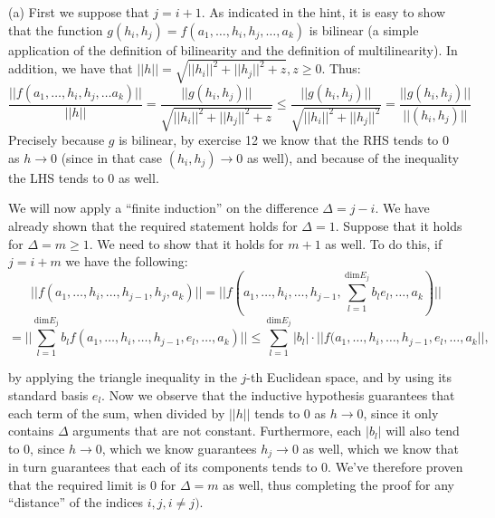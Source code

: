 \begin{solution}

    (a) First we suppose that $j = i +1$.
    As indicated in the hint, it is easy to show that  the function $g(h_i, h_j) = f(a_1, \ldots, h_i, h_{j}, \ldots, a_k)$ is bilinear (a simple application of the definition of bilinearity and the definition of multilinearity).
    In addition, we have that $\lvert \lvert h \rvert \rvert = \sqrt{\lvert \lvert h_i \rvert \rvert^2 + \lvert \lvert h_j \rvert \rvert^2 + z}, z \geq 0$.
    Thus:
    $$\frac{\lvert \lvert f(a_1, \ldots, h_i, h_{j}, \ldots a_k) \rvert \rvert}{\lvert \lvert h \rvert \rvert} = \frac{\lvert \lvert g(h_i, h_j) \rvert \rvert}{\sqrt{\lvert \lvert h_i \rvert \rvert^2 + \lvert \lvert h_j \rvert \rvert^2 + z}} \leq \frac{\lvert \lvert g(h_i, h_j) \rvert \rvert}{\sqrt{\lvert \lvert h_i \rvert \rvert^2 + \lvert \lvert h_j \rvert \rvert^2}} = \frac{\lvert \lvert g(h_i, h_j) \rvert \rvert}{\lvert \lvert (h_i, h_j) \rvert \rvert}$$
    Precisely because $g$ is bilinear, by exercise 12 we know that the RHS tends to 0 as $h \rightarrow 0 $ (since in that case $(h_i, h_j) \rightarrow 0 $ as well), and because of the inequality the LHS tends to 0 as well.

    We will now apply a ``finite induction'' on the difference $\Delta = j - i$.
    We have already shown that the required statement holds for $\Delta = 1$.
    Suppose that it holds for $\Delta = m \geq 1$.
    We need to show that it holds for $m + 1$ as well.
    To do this, if $j = i + m$ we have the following:
    $$\lvert \lvert f(a_1, \ldots, h_i, \ldots, h_{j-1}, h_j, a_k) \rvert \vert = \lvert \lvert f(a_1, \ldots, h_i, \ldots, h_{j-1}, \sum_{l=1}^{\text{dim} E_j} b_l e_l, \ldots, a_k) \rvert \rvert$$
    $$= \lvert \lvert \sum_{l=1}^{\text{dim} E_j} b_l f(a_1, \ldots, h_i, \ldots, h_{j-1}, e_l, \ldots, a_k) \rvert \rvert \leq \sum_{l=1}^{\text{dim} E_j} \lvert b_l \rvert \cdot \lvert \lvert f(a_1, \ldots, h_i, \ldots, h_{j-1}, e_l, \ldots, a_k \rvert \rvert,$$

    by applying the triangle inequality in the $j$-th Euclidean space, and by using its standard basis $e_{l}$. 
    Now we observe that the inductive hypothesis guarantees that each term of the sum, when divided by $\lvert \lvert h \rvert \rvert$ tends to 0 as $h \rightarrow 0$, since it only contains $\Delta$ arguments that are not constant.
    Furthermore, each $\lvert b_l \rvert$ will also tend to 0, since $h \rightarrow 0$, which we know guarantees $h_j \rightarrow 0$ as well, which we know that in turn guarantees that each of its components tends to 0.
    We've therefore proven that the required limit is 0 for $\Delta = m$ as well, thus completing the proof for any ``distance'' of the indices $i, j, i \neq j)$.


\end{solution}
